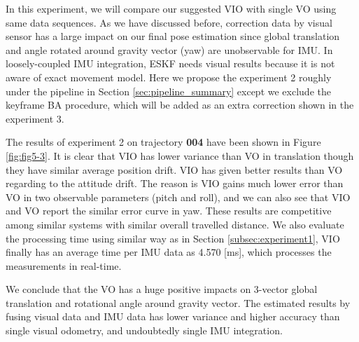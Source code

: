 In this experiment, we will compare our suggested VIO with single VO using same data sequences. As we have discussed before, correction data by visual sensor has a large impact on our final pose estimation since global translation and angle rotated around gravity vector (yaw) are unobservable for IMU. In loosely-coupled IMU integration, ESKF needs visual results because it is not aware of exact movement model. Here we propose the experiment 2 roughly under the pipeline in Section \ref{sec:pipeline_summary} except we exclude the keyframe BA procedure, which will be added as an extra correction shown in the experiment 3.

The results of experiment 2 on trajectory \textbf{004} have been shown in Figure \ref{fig:fig5-3}. It is clear that VIO has lower variance than VO in translation though they have similar average position drift. VIO has given better results than VO regarding to the attitude drift. The reason is VIO gains much lower error than VO in two observable parameters (pitch and roll), and we can also see that VIO and VO report the similar error curve in yaw. These results are competitive among similar systems \cite{mourikis2007multi, forster2015imu} with similar overall travelled distance. We also evaluate the processing time using similar way as in Section \ref{subsec:experiment1}, VIO finally has an average time per IMU data as 4.570 [ms], which processes the measurements in real-time.

We conclude that the VO has a huge positive impacts on 3-vector global translation and rotational angle around gravity vector. The estimated results by fusing visual data and IMU data has lower variance and higher accuracy than single visual odometry, and undoubtedly single IMU integration.

